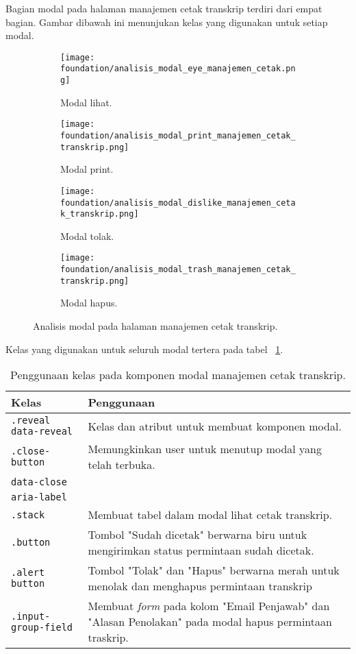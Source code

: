 Bagian modal pada halaman manajemen cetak transkrip terdiri dari empat bagian. Gambar dibawah ini menunjukan kelas yang digunakan untuk setiap modal.

\begin{figure}[H]	
	\centering
	\begin{subfigure}[b]{0.6\linewidth}  
		\texttt{[image: foundation/analisis\_modal\_eye\_manajemen\_cetak.png]}
		\caption{Modal lihat.} 
	\end{subfigure}	
	\begin{subfigure}[b]{0.6\linewidth}  
		\texttt{[image: foundation/analisis\_modal\_print\_manajemen\_cetak\_transkrip.png]}
		\caption{Modal print.} 
	\end{subfigure}
	\begin{subfigure}[b]{0.6\linewidth}
		\texttt{[image: foundation/analisis\_modal\_dislike\_manajemen\_cetak\_transkrip.png]}
		\caption{Modal tolak.}  
	\end{subfigure}	
	\begin{subfigure}[b]{0.6\linewidth}	
		\texttt{[image: foundation/analisis\_modal\_trash\_manajemen\_cetak\_transkrip.png]}
		\caption{Modal hapus.}
	\end{subfigure}
\caption{Analisis modal pada halaman manajemen cetak transkrip.}
\label{fig:analisisModalManajemenCetakTranskrip}
\end{figure}

\noindent Kelas yang digunakan untuk seluruh modal tertera pada tabel ~\ref{table:analisisModalManajemenCetakTranskrip}.

\begin{table}[H]
	\centering
	\caption{Penggunaan kelas pada komponen modal manajemen cetak transkrip.}
	\begin{tabularx}{\textwidth}{lX}
		\toprule
		Kelas     & Penggunaan \\
		\midrule
		\texttt{.reveal data-reveal} & Kelas dan atribut untuk membuat komponen modal.\\
		\texttt{.close-button}  & Memungkinkan user untuk menutup modal yang telah terbuka.\\
		\texttt{data-close} & \\
		\texttt{aria-label} & \\
		\texttt{.stack} & Membuat tabel dalam modal lihat cetak transkrip.\\
		\texttt{.button} & Tombol "Sudah dicetak" berwarna biru untuk mengirimkan status permintaan sudah dicetak. \\
		\texttt{.alert button} & Tombol "Tolak" dan "Hapus" berwarna merah untuk menolak dan menghapus permintaan transkrip\\
		\texttt{.input-group-field} & Membuat  \textit{form} pada kolom "Email Penjawab" dan "Alasan Penolakan" pada modal hapus permintaan traskrip.\\
		\bottomrule
	\end{tabularx}%
	\label{table:analisisModalManajemenCetakTranskrip}
\end{table}%

